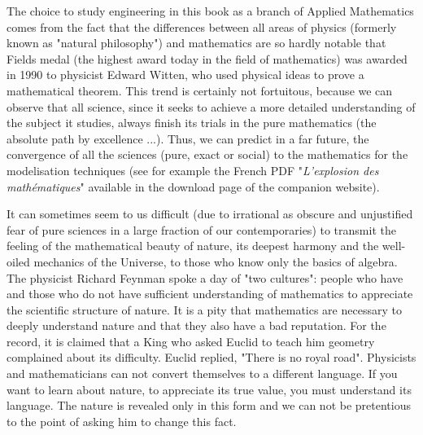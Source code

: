 	The choice to study engineering in this book as a branch of Applied Mathematics comes from the fact that the differences between all areas of physics (formerly known as "natural philosophy") and mathematics are so hardly notable that Fields medal (the highest award today in the field of mathematics) was awarded in 1990 to physicist Edward Witten, who used physical ideas to prove a mathematical theorem. This trend is certainly not fortuitous, because we can observe that all science, since it seeks to achieve a more detailed understanding of the subject it studies, always finish its trials in the pure mathematics (the absolute path by excellence ...). Thus, we can predict in a far future, the convergence of all the sciences (pure, exact or social) to the mathematics for the modelisation techniques (see for example the French PDF "\textit{L'explosion des mathématiques}" available in the download page of the companion website).

	It can sometimes seem to us difficult (due to irrational as obscure and unjustified fear of pure sciences in a large fraction of our contemporaries) to transmit the feeling of the mathematical beauty of nature, its deepest harmony and the well-oiled mechanics of the Universe, to those who know only the basics of algebra. The physicist Richard Feynman spoke a day of "two cultures": people who have and those who do not have sufficient understanding of mathematics to appreciate the scientific structure of nature. It is a pity that mathematics are necessary to deeply understand nature and that they also have a bad reputation. For the record, it is claimed that a King who asked Euclid to teach him geometry complained about its difficulty. Euclid replied, "There is no royal road". Physicists and mathematicians can not convert themselves to a different language. If you want to learn about nature, to appreciate its true value, you must understand its language. The nature is revealed only in this form and we can not be pretentious to the point of asking him to change this fact.

